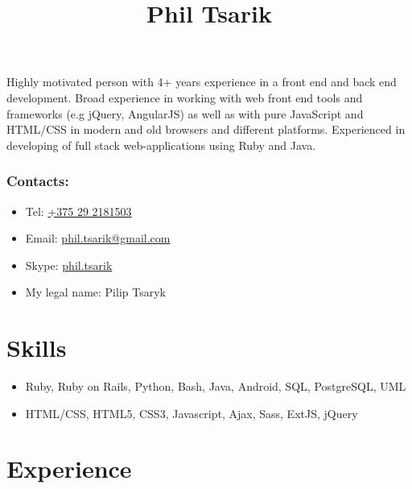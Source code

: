 \documentclass[a4paper, 12pt]{article}
\title{Phil Tsarik}
\author{}
\date{}
\begin{document}
\maketitle

Highly motivated person with 4+ years experience in a front end and back end development.
Broad experience in working with web front end tools and frameworks (e.g jQuery, AngularJS) as well as with pure JavaScript and HTML/CSS in modern and old browsers and different platforms.
Experienced in developing of full stack web-applications using Ruby and Java.

\subsubsection*{Contacts:}
\begin{itemize}
    \item Tel: \href{tel:+375292181503}{+375 29 2181503}
    \item Email: \href{mailto:phil.tsarik@gmail.com}{phil.tsarik@gmail.com}
    \item Skype: \href{callto:phil.tsarik}{phil.tsarik}
    \item My legal name: Pilip Tsaryk
\end{itemize}


\section*{Skills}

    \begin{itemize}
        \item Ruby, Ruby on Rails, Python, Bash, Java, Android, SQL, PostgreSQL, UML
        \item HTML/CSS, HTML5, CSS3, Javascript, Ajax, Sass, ExtJS, jQuery
    \end{itemize}


\section*{Experience}
\end{document}
